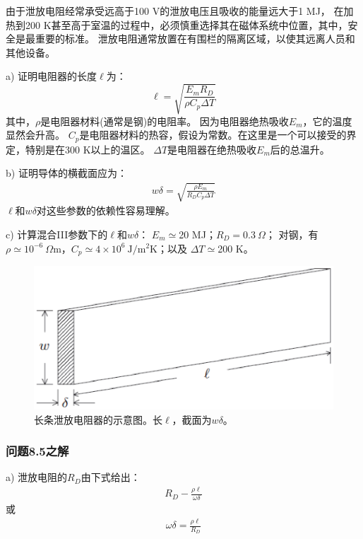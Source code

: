 由于泄放电阻经常承受远高于100 V的泄放电压且吸收的能量远大于1 MJ，
在加热到200 K甚至高于室温的过程中，必须慎重选择其在磁体系统中位置，其中，安全是最重要的标准。
泄放电阻通常放置在有围栏的隔离区域，以使其远离人员和其他设备。

a) 证明电阻器的长度$\ell$为：
\begin{equation}%
\ell=\sqrt{\frac{E_mR_D}{\rho C_p\Delta T}}
\end{equation}
其中，$\rho$是电阻器材料(通常是钢)的电阻率。
因为电阻器绝热吸收$E_m$，它的温度显然会升高。
$C_p$是电阻器材料的热容，假设为常数。在这里是一个可以接受的界定，特别是在300 K以上的温区。
$\Delta T$是电阻器在绝热吸收$E_m$后的总温升。

b) 证明导体的横截面应为：
\begin{align*}%
w\delta=\sqrt{\frac{\rho E_m}{R_DC_p\Delta T}} \tag{8.75b}
\end{align*}
$\ell$和$w\delta$对这些参数的依赖性容易理解。

c) 计算混合III参数下的$\ell$和$w\delta$：
$E_m\simeq$20 MJ；$R_D=0.3\ \Omega$；
对钢，有$\rho\simeq10^{-6}\ \Omega$m，$C_p\simeq 4\times 10^6\ \mathrm{J/m^2K}$；以及
$\Delta T\simeq$200 K。
\begin{figure}
	\centering
	\includegraphics[scale=0.6]{chpt8/figs/fig8.22.eps}
	\caption{长条泄放电阻器的示意图。长$\ell$，截面为$w\delta$。}
\end{figure}

\subsubsection{问题8.5之解}
a) 泄放电阻的$R_D$由下式给出：
\begin{align*}%
R_D-\frac{\rho\ell}{\omega\delta} \tag{S5.1a}
\end{align*}
或
\begin{align*}%
\omega\delta=\frac{\rho\ell}{R_D} \tag{S5.1b}
\end{align*}

